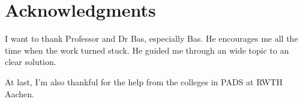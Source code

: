 \cleardoublepage

\chapter*{Acknowledgments}

I want to thank Professor and Dr Bas, especially Bas. He encourages me all the time when the work turned stuck. He guided me through an wide topic to an clear solution. 

At last, I'm also thankful for the help from the colleges in PADS at RWTH Aachen. 
